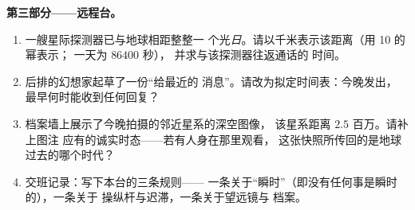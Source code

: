 \begin{problem}
\medskip\noindent\textbf{第三部分——远程台。}
\begin{enumerate}[resume]
  \item 一艘星际探测器已与地球相距整整一
        个光\emph{日}。请以千米表示该距离（用 10 的幂表示；
        一天为 $86400$ 秒），
        并求与该探测器往返通话的
        时间。
  \item 后排的幻想家起草了一份“给最近的
        消息”。请改为拟定时间表：今晚发出，
        最早何时能收到任何回复？
  \item 档案墙上展示了今晚拍摄的邻近星系的深空图像，
        该星系距离 $2.5$ 百万。请补上图注
        应有的诚实时态——若有人身在那里观看，
        这张快照所传回的是地球
        过去的哪个时代？
  \item 交班记录：写下本台的三条规则——
        一条关于“瞬时”（即没有任何事是瞬时的），一条关于
        操纵杆与迟滞，一条关于望远镜与
        档案。
\end{enumerate}
\end{problem}
